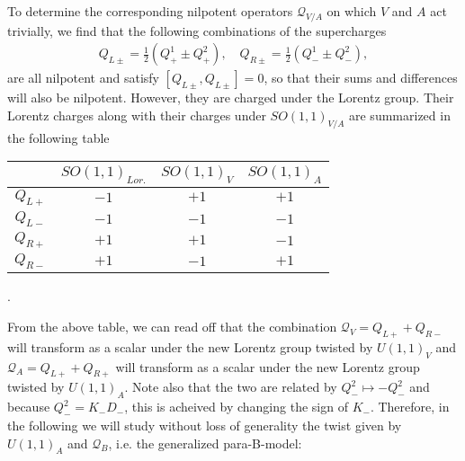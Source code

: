 \documentclass[letterpaper,12pt]{article}
\newcommand{\QQ}{\mathcal{Q}}
\theoremstyle{definition}
\theoremstyle{remark}
\theoremstyle{examples}
\begin{document}
To determine the corresponding nilpotent operators $\QQ_{V/A}$ on which $V$ and $A$ act trivially, we find that the following combinations of the supercharges
\begin{align*}
Q_{L\pm}=\frac{1}{2}(Q^1_+\pm Q^2_+),\quad Q_{R\pm}=\frac{1}{2}(Q^1_-\pm Q^2_-),
\end{align*}
are all nilpotent and satisfy $[Q_{L\pm},Q_{L\pm}]=0$, so that their sums and differences will also be nilpotent. However, they are charged under the Lorentz group. Their Lorentz charges along with their charges under $SO(1,1)_{V/A}$ are summarized in the following table
\bigskip
\begin{center}
\begin{tabular}{c|c c c}
		& $SO(1,1)_{Lor.}$ & $SO(1,1)_V$ & $SO(1,1)_A$\\ \hline
$Q_{L+}$& $-1$ & $+1$ & $+1$\\
$Q_{L-}$& $-1$ & $-1$ & $-1$\\
$Q_{R+}$& $+1$ & $+1$ & $-1$\\
$Q_{R-}$& $+1$ & $-1$ & $+1$
\end{tabular}.
\end{center}
\bigskip
From the above table, we can read off that the combination $\QQ_V=Q_{L+}+Q_{R-}$ will transform as a scalar under the new Lorentz group twisted by $U(1,1)_V$ and $\QQ_A=Q_{L+}+Q_{R+}$ will transform as a scalar under the new Lorentz group twisted by $U(1,1)_A$. Note also that the two are related by $Q_-^2\mapsto -Q_-^2$ and because $Q_-^2=K_-D_-$, this is acheived by changing the sign of $K_-$. Therefore, in the following we will study without loss of generality the twist given by $U(1,1)_A$ and $\QQ_B$, i.e. the generalized para-B-model:
\end{document}
